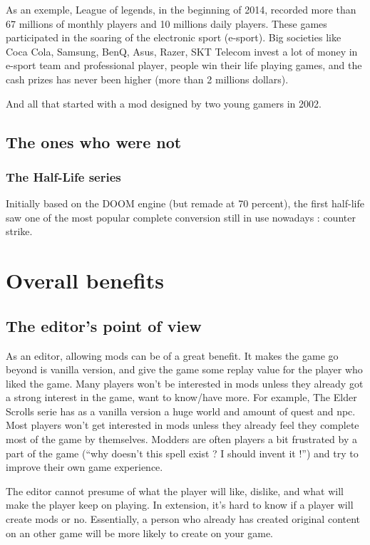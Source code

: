 \documentclass[a4paper,11pt]{article}
\begin{document}
As an exemple,  League of legends, in the beginning of 2014, recorded more than 67 millions of monthly players and 10 millions daily players. These games participated in the soaring of the electronic sport (e-sport). Big societies like Coca Cola, Samsung, BenQ, Asus, Razer, SKT Telecom invest a lot of money in e-sport team and professional player, people win their life playing games, and the cash prizes has never been higher (more than 2 millions dollars).

And all that started with a mod designed by two young gamers in 2002.

\subsection{The ones who were not}

\subsubsection{The Half-Life series}

Initially based on the DOOM engine (but remade at 70 percent), the first half-life saw one of the most popular complete conversion still in use nowadays : counter strike.



\section{Overall benefits}

\subsection{The editor's point of view}

As an editor, allowing mods can be of a great benefit. It makes the game go beyond is vanilla version, and give the game some replay value for the player who liked the game. Many players won’t be interested in mods unless they already got a strong interest in the game, want to know/have more. For example, The Elder Scrolls serie has as a vanilla version a huge world and amount of quest and npc. Most players won’t get interested in mods unless they already feel they complete most of the game by themselves. Modders are often players a bit frustrated by a part of the game (“why doesn’t this spell exist ? I should invent it !”) and try to improve their own game experience.

The editor cannot presume of what the player will like, dislike, and what will make the player keep on playing. In extension, it’s hard to know if a player will create mods or no. Essentially, a person who already has created original content on an other game will be more likely to create on your game.
\end{document}
